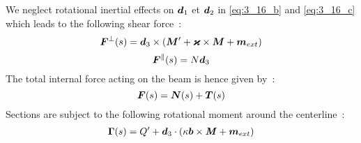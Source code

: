 We neglect rotational inertial effects on $\boldsymbol{d}_1$ et $\boldsymbol{d}_2$ in \eqref{eq:3_16_b} and \eqref{eq:3_16_c} which leads to the following shear force~:
\begin{equation}
	\boldsymbol{F}^{\perp}(s) = \boldsymbol{d}_3 \times (\boldsymbol{M}' + \boldsymbol{\varkappa} \times \boldsymbol{M} + \boldsymbol{m}_{ext})
\end{equation}
\begin{equation}
	\boldsymbol{F}^{\parallel}(s) = N \boldsymbol{d}_3
\end{equation}
 The total internal force acting on the beam is hence given by~:
\begin{equation}
	\boldsymbol{F}(s) = \boldsymbol{N}(s) + \boldsymbol{T}(s)
\end{equation}
Sections are subject to the following rotational moment around the centerline~:
\begin{equation}
	\begin{aligned}
	\boldsymbol{\Gamma}(s) = Q' + \boldsymbol{d}_3 \cdot ( \kappa\boldsymbol{b} \times \boldsymbol{\mathit{M}} + \boldsymbol{m}_{ext})
	\end{aligned}
\end{equation}

